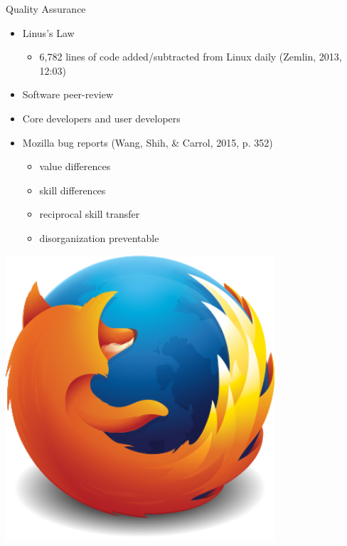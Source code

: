 \begin{frame}{Quality Assurance}
\begin{minipage}{0.5\textwidth}
\begin{itemize}
  \item Linus's Law
   \begin{itemize}
     \item 6,782 lines of code added/subtracted from Linux daily (Zemlin, 2013, 12:03) 
   \end{itemize}
 \item Software peer-review
 \item Core developers and user developers
 \item Mozilla bug reports (Wang, Shih, \& Carrol, 2015, p. 352)  
   \begin{itemize}
     \item value differences
     \item skill differences
     \item reciprocal skill transfer
     \item disorganization preventable
   \end{itemize}
\end{itemize}
\end{minipage}
\begin{minipage}{0.4\textwidth}
\includegraphics[width = 0.75\textwidth]{fox.png}
\end{minipage}
\end{frame}

